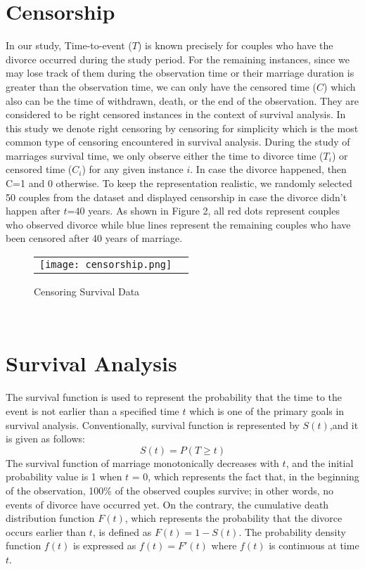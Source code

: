 \documentclass[10pt,twocolumn]{article}
\begin{document}
\section{Censorship}
In our study, Time-to-event ($T$) is known precisely for couples who have the divorce occurred during the study period. For the remaining instances, since we may lose track of them during the observation time or their marriage duration is greater than the observation time, we can only have the censored time ($C$) which also can be the time of withdrawn, death, or the end of the observation. They are considered to be right censored instances in the context of survival analysis. In this study we denote right censoring by censoring for simplicity which is the most common type of censoring encountered in survival analysis\cite{klein2003censoring}. During the study of marriages survival time, we only observe either the time to divorce time ($T_i$) or censored time ($C_i$) for any given instance $i$. In case the divorce happened, then C=1 and $0$ otherwise. To keep the representation realistic, we randomly selected 50 couples from the dataset and displayed censorship in case the divorce didn't happen after $t$=$40$ years. As shown in Figure 2, all red dots represent couples who observed divorce while blue lines represent the remaining couples who have been censored after 40 years of marriage.
\begin{figure}[!htb]
\setlength{\tabcolsep}{1em}
\centering
\begin{tabular} {cc}
\texttt{[image: censorship.png]}
\end{tabular}
\caption{Censoring Survival Data}
\label{Fig:Censoring}
\end{figure}\\
\section{Survival Analysis}
The survival function is used to represent the probability that the time to the event  is not earlier than a specified time $t$ \cite{klein2005survival} which is one of the primary goals in survival analysis. Conventionally, survival function is represented by $S(t)$,and it is given as follows:
\begin{equation}
S(t) = P(T \geq t)
\end{equation} 
The survival function of marriage monotonically decreases with $t$, and the initial probability value is 1 when $t$ = 0, which represents the fact that, in the beginning of the observation, 100\% of the observed couples survive; in other words, no events of divorce have occurred yet. On the contrary, the cumulative death distribution function $F(t)$, which represents the probability that the divorce occurs earlier than $t$, is defined as $F(t) = 1 - S(t)$. The probability density function $f(t)$ is expressed as $f(t)= F'(t)$ where $f(t)$ is continuous at time $t$.
\end{document}
